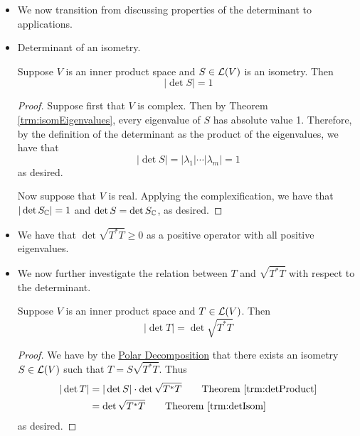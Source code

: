 \documentclass[../main.tex]{subfiles}
\begin{document}
\begin{itemize}
\begin{theorem}
    \end{theorem}
    \item We now transition from discussing properties of the determinant to applications.
    \item Determinant of an isometry.
    \begin{theorem}\label{trm:detIsom}
        Suppose $V$ is an inner product space and $S\in\mathcal{L}(V)$ is an isometry. Then
        \begin{equation*}
            |\det S| = 1
        \end{equation*}
        \begin{proof}
            Suppose first that $V$ is complex. Then by Theorem \ref{trm:isomEigenvalues}, every eigenvalue of $S$ has absolute value 1. Therefore, by the definition of the determinant as the product of the eigenvalues, we have that
            \begin{equation*}
                |\det S| = |\lambda_1|\cdots|\lambda_m| = 1
            \end{equation*}
            as desired.\par
            Now suppose that $V$ is real. Applying the complexification, we have that $|\det S_{\mathbb{C}}|=1$ and $\det S=\det S_{\mathbb{C}}$, as desired.
        \end{proof}
    \end{theorem}
    \item We have that $\det\sqrt{T^*T}\geq 0$ as a positive operator with all positive eigenvalues.
    \item We now further investigate the relation between $T$ and $\sqrt{T^*T}$ with respect to the determinant.
    \begin{theorem}
        Suppose $V$ is an inner product space and $T\in\mathcal{L}(V)$. Then
        \begin{equation*}
            |\det T| = \det\sqrt{T^*T}
        \end{equation*}
        \begin{proof}
            We have by the \hyperref[trm:polarDecomp]{Polar Decomposition} that there exists an isometry $S\in\mathcal{L}(V)$ such that $T=S\sqrt{T^*T}$. Thus
            \begin{align*}
                |\det T| &= |\det S|\cdot\det\sqrt{T^*T}\tag*{Theorem \ref{trm:detProduct}}\\
                &= \det\sqrt{T^*T}\tag*{Theorem \ref{trm:detIsom}}
            \end{align*}
            as desired.
        \end{proof}

\end{theorem}
\end{itemize}
\end{document}
